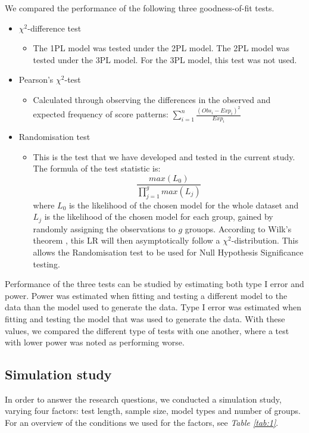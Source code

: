 \documentclass[Royal,sageapa,times, doublespace]{sagej}
\begin{document}
We compared the performance of the following three goodness-of-fit tests.
\begin{itemize}
\item{$\chi^2$-difference test}
	\begin{itemize}
	\item{The 1PL model was tested under the 2PL model. The 2PL model was tested under the 3PL model. For the 3PL model, this test was not used.}
	\end{itemize}
\item{Pearson's $\chi^2$-test}
	\begin{itemize}
	\item{Calculated through observing the differences in the observed and expected frequency of score patterns: $\sum_{i = 1}^{n}\frac{(Obs_i - Exp_i)^2}{Exp_i}$}
	\end{itemize}
\item{Randomisation test}
	\begin{itemize}
	\item{This is the test that we have developed and tested in the current study. The formula of the test statistic is:
	\begin{equation}
		\frac{max(L_0)}{\prod_{j = 1}^g max(L_j)}
	\end{equation} where $L_0$ is the likelihood of the chosen model for the whole dataset and $L_j$ is the likelihood of the chosen model for each group, gained by randomly assigning the observations to $g$ grouops. According to Wilk's theorem \cite{willkth}, this LR will then asymptotically follow a $\chi^2$-distribution. This allows the Randomisation test to be used for Null Hypothesis Significance testing.} 
	\end{itemize}
\end{itemize}

Performance of the three tests can be studied by estimating both type I error and power. Power was estimated when fitting and testing a different model to the data than the model used to generate the data. Type I error was estimated when fitting and testing the model that was used to generate the data. With these values, we compared the different type of tests with one another, where a test with lower power was noted as performing worse.

\subsection{Simulation study}
In order to answer the research questions, we conducted a simulation study, varying four factors: test length, sample size, model types and number of groups. For an overview of the conditions we used for the factors, see \textit{Table \ref{tab:1}}.
\end{document}
